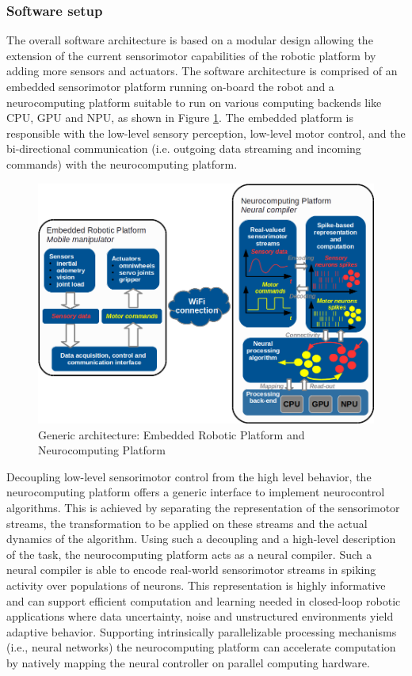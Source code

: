 \subsubsection{Software setup}%
\label{ssubsec:software_setup}

The overall software architecture is based on a modular design allowing the extension of the current sensorimotor capabilities of the robotic platform by adding more sensors and actuators. 
The software architecture is comprised of an embedded sensorimotor platform running on-board the robot and a neurocomputing platform suitable to run on various computing backends like \ac{CPU}, \ac{GPU} and \ac{NPU}, as shown in Figure \ref{fig:neurocomputing_platform}. 
The embedded platform is responsible with the low-level sensory perception, low-level motor control, and the bi-directional communication (i.e. outgoing data streaming and incoming commands) with the neurocomputing platform. 
\begin{figure}[t]
    \centering
    \includegraphics[width=0.8\linewidth]{imgs/neurocomputing_platform.png}
    \caption{Generic architecture: Embedded Robotic Platform and Neurocomputing Platform}
    \label{fig:neurocomputing_platform}
\end{figure}
Decoupling low-level sensorimotor control from the high level behavior, the neurocomputing platform offers a generic interface to implement neurocontrol algorithms. 
This is achieved by separating the representation of the sensorimotor streams, the transformation to be applied on these streams and the actual dynamics of the algorithm. 
Using such a decoupling and a high-level description of the task, the neurocomputing platform acts as a neural compiler. 
Such a neural compiler is able to encode real-world sensorimotor streams in spiking activity over populations of neurons. 
This representation is highly informative and can support efficient computation and learning needed in closed-loop robotic applications where data uncertainty, noise and unstructured environments yield adaptive behavior. 
Supporting intrinsically parallelizable processing mechanisms (i.e., neural networks) the neurocomputing platform can accelerate computation by natively mapping the neural controller on parallel computing hardware.

